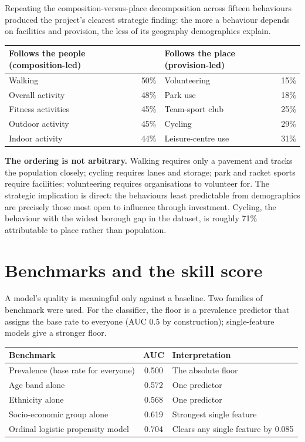 \documentclass[ %
                    author={Ashrey Ashrey, Sanya Kapoor, Trisha Sharma, Yash Bhooshan Pandloskar},
                supervisor={Dr. Dalila O’Grady},
                    degree={MSc},
                     title={Using machine learning to forecast physical activity participation, volunteering and activity patterns in London},
                  subtitle={},
                      type={},
                      year={2021}]{dissertation}
\begin{document}
\noindent
Repeating the composition-versus-place decomposition across fifteen behaviours produced the project's clearest strategic finding: the more a behaviour depends on facilities and provision, the less of its geography demographics explain.

\begin{table}[!htb]
\centering
\begin{tabular}{lclc}
\toprule
\textbf{Follows the people (composition-led)} & & \textbf{Follows the place (provision-led)} & \\
\midrule
Walking & 50\% & Volunteering & 15\% \\
Overall activity & 48\% & Park use & 18\% \\
Fitness activities & 45\% & Team-sport club & 25\% \\
Outdoor activity & 45\% & Cycling & 29\% \\
Indoor activity & 44\% & Leisure-centre use & 31\% \\
\bottomrule
\end{tabular}
\end{table}

\noindent
\textbf{The ordering is not arbitrary.} Walking requires only a pavement and tracks the population closely; cycling requires lanes and storage; park and racket sports require facilities; volunteering requires organisations to volunteer for. The strategic implication is direct: the behaviours least predictable from demographics are precisely those most open to influence through investment. Cycling, the behaviour with the widest borough gap in the dataset, is roughly 71\% attributable to place rather than population.

\section{Benchmarks and the skill score}

\noindent
A model's quality is meaningful only against a baseline. Two families of benchmark were used. For the classifier, the floor is a prevalence predictor that assigns the base rate to everyone (AUC 0.5 by construction); single-feature models give a stronger floor.

\begin{table}[!htb]
\centering
\begin{tabular}{lcl}
\toprule
\textbf{Benchmark} & \textbf{AUC} & \textbf{Interpretation} \\
\midrule
Prevalence (base rate for everyone) & 0.500 & The absolute floor \\
Age band alone & 0.572 & One predictor \\
Ethnicity alone & 0.568 & One predictor \\
Socio-economic group alone & 0.619 & Strongest single feature \\
Ordinal logistic propensity model & 0.704 & Clears any single feature by 0.085 \\
\bottomrule
\end{tabular}
\end{table}
\end{document}
